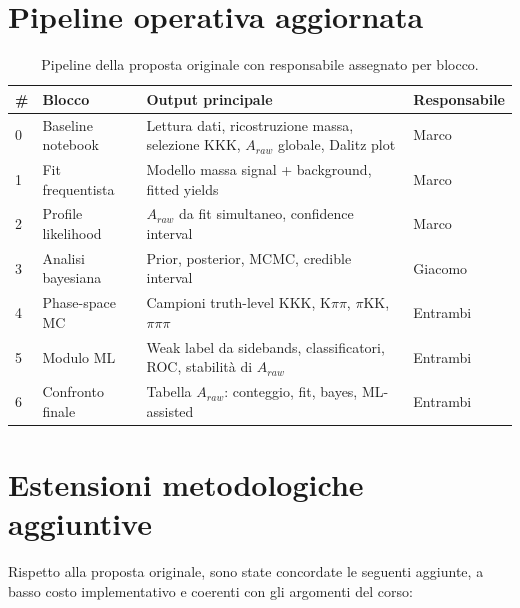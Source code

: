 \documentclass[11pt,a4paper]{article}
\begin{document}
\section{Pipeline operativa aggiornata}

\begin{table}[h!]
\centering
\begin{tabular}{L{0.8cm} L{4.2cm} L{5.5cm} L{2.3cm}}
\toprule
\textbf{\#} & \textbf{Blocco} & \textbf{Output principale} & \textbf{Responsabile} \\
 & Baseline notebook & Lettura dati, ricostruzione massa, selezione KKK, $A_{raw}$ globale, Dalitz plot & Marco \\
1 & Fit frequentista & Modello massa signal + background, fitted yields & Marco \\
2 & Profile likelihood & $A_{raw}$ da fit simultaneo, confidence interval & Marco \\
3 & Analisi bayesiana & Prior, posterior, MCMC, credible interval & Giacomo \\
4 & Phase-space MC & Campioni truth-level KKK, K$\pi\pi$, $\pi$KK, $\pi\pi\pi$ & Entrambi \\
5 & Modulo ML & Weak label da sidebands, classificatori, ROC, stabilit\`a di $A_{raw}$ & Entrambi \\
6 & Confronto finale & Tabella $A_{raw}$: conteggio, fit, bayes, ML-assisted & Entrambi \\
\bottomrule
\end{tabular}
\caption{Pipeline della proposta originale con responsabile assegnato per blocco.}
\end{table}

\section{Estensioni metodologiche aggiuntive}

Rispetto alla proposta originale, sono state concordate le seguenti aggiunte, a basso costo implementativo e coerenti con gli argomenti del corso:
\end{document}
